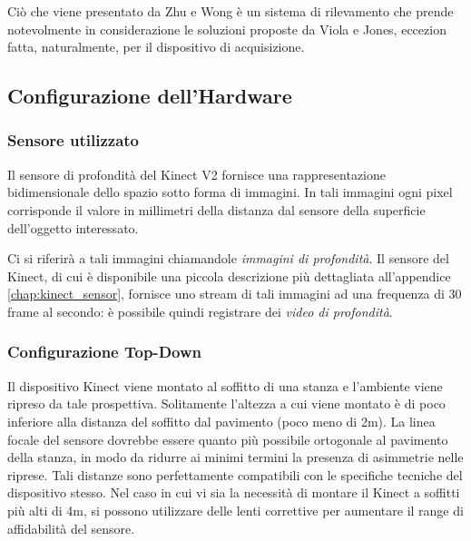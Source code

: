                 Ciò che viene presentato da Zhu e Wong è un sistema di rilevamento che prende notevolmente in considerazione le soluzioni proposte da Viola e Jones, eccezion fatta, naturalmente, per il dispositivo di acquisizione.

        \subsection{Configurazione dell'Hardware}
        \label{sub:hardware_configuration}
            \subsubsection{Sensore utilizzato}
                Il sensore di profondità del Kinect V2 fornisce una rappresentazione bidimensionale dello spazio sotto forma di immagini. In tali immagini ogni pixel corrisponde il valore in millimetri della distanza dal sensore della superficie dell'oggetto interessato.

                Ci si riferirà a tali immagini chiamandole \emph{immagini di profondità}. Il sensore del Kinect, di cui è disponibile una piccola descrizione più dettagliata all'appendice \ref{chap:kinect_sensor}, fornisce uno stream di tali immagini ad una frequenza di 30 frame al secondo: è possibile quindi registrare dei \emph{video di profondità}.

            \subsubsection{Configurazione Top-Down}
                Il dispositivo Kinect viene montato al soffitto di una stanza e l'ambiente viene ripreso da tale prospettiva.
                Solitamente l'altezza a cui viene montato è di poco inferiore alla distanza del soffitto dal pavimento (poco meno di 2m).
                La linea focale del sensore dovrebbe essere quanto più possibile ortogonale al pavimento della stanza, in modo da ridurre ai minimi termini la presenza di asimmetrie nelle riprese.
                Tali distanze sono perfettamente compatibili con le specifiche tecniche del dispositivo stesso.
                Nel caso in cui vi sia la necessità di montare il Kinect a soffitti più alti di 4m, si possono utilizzare delle lenti correttive per aumentare il range di affidabilità del sensore.


